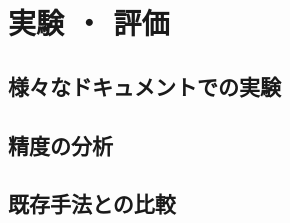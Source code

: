 \chapter{実験 ・ 評価}
\label{ch:exp}

\quad

\section{様々なドキュメントでの実験}
\label{sec:exp_xxx}

\section{精度の分析}
\label{subsec:exp_yyy}

\section{既存手法との比較}
\label{subsec:exp_zzz}

